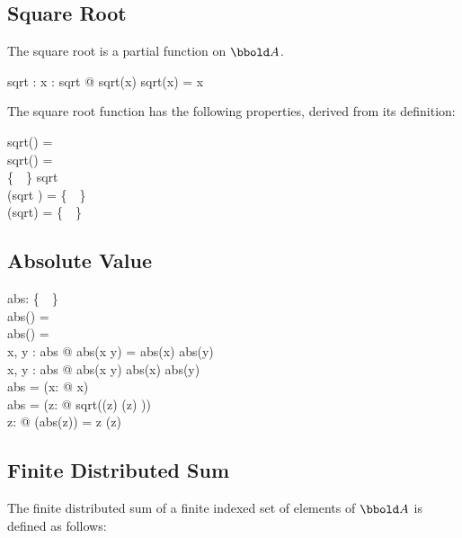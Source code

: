 \documentclass[12pt]{article}
\begin{document}
\subsection{Square Root}
\label{sec:square-root}
The square root is a partial function on $\arithmos$.
\begin{axdef}
  sqrt : \arithmos \pfun \arithmos
  \where
  \forall x : \dom sqrt @ sqrt(x) \amult sqrt(x) = x
\end{axdef}

The square root function has the following properties, derived from
its definition:
\begin{zed}
  sqrt(\azero) = \azero\\
  sqrt(\aone) = \aone\\
  \realplus \cup \{~\azero~\} \subseteq \dom sqrt\\
  \dom (sqrt \rres \real) = \realplus \cup \{~\azero~\}\\
  \ran (\real \dres sqrt) = \realplus \cup \{~\azero~\}\\
\end{zed}

\subsection{Absolute Value}
\label{sec:abs}

\begin{axdef}
  abs: \arithmos \pfun \realplus \cup \{~\azero~\}\\
  \where
  abs(\azero) = \azero\\
  abs(\aone) = \aone\\
  \forall x, y : \dom abs @ abs(x \amult y) = abs(x) \amult abs(y)\\
  \forall x, y : \dom abs @ abs(x \aplus y) \aleq abs(x) \aplus
  abs(y)\\
  \real \dres abs = \id \real \oplus (\lambda x: \realminus @ \aneg
  x)\\
  \complex \dres abs = (\lambda z: \complex @ sqrt(\Re(z) 
  \aplus \Im(z) ))\\
  \forall z: \complex @ (abs(z))  = z \amult \aconj(z)\\
\end{axdef}

\subsection{Finite Distributed Sum}
\label{sec:fin-distr-sum}
The finite distributed sum of a finite indexed set of elements of
$\arithmos$ is defined as follows:
\end{document}
